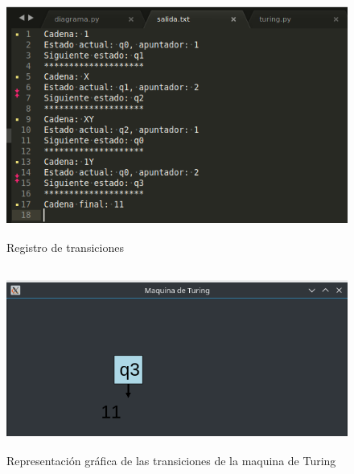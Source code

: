 \begin{figure}[H]
\begin{center}
 \includegraphics[width=13cm, height=8cm]{./img/uno_historial.png}
 \caption{Registro de transiciones}
 \label{fig:uno_historial}
\end{center}
\end{figure}

\begin{figure}[H]
\begin{center}
 \includegraphics[width=13cm, height=6cm]{./img/uno_grafica.png}
 \caption{Representación gráfica de las transiciones de la maquina de Turing}
 \label{fig:uno_grafica}
\end{center}
\end{figure}

